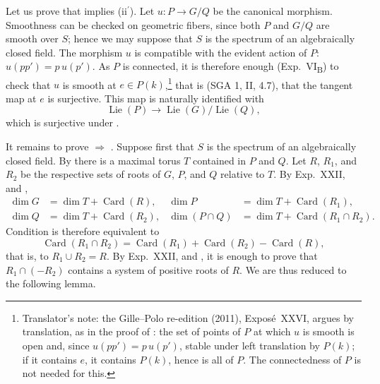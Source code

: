 Let us prove that \textup{} implies
\textup{(ii\(^{\prime}\))}.  Let \(u:P\to G/Q\) be the canonical
morphism.  Smoothness can be checked on geometric fibers, since both
\(P\) and \(G/Q\) are smooth over \(S\); hence we may suppose that
\(S\) is the spectrum of an algebraically closed field.  The morphism
\(u\) is compatible with the evident action of \(P\):
\(u(pp')=p\,u(p')\).  As \(P\) is connected, it is therefore enough
(Exp.\ VI\textsubscript{B}) to check that \(u\) is smooth at
\(e\in P(k)\),\footnote{Translator's note: the Gille--Polo re-edition (2011), Exposé~XXVI, argues
by translation, as in the proof of : the set of points of
\(P\) at which \(u\) is smooth is open and, since \(u(pp')=p\,u(p')\), stable
under left translation by \(P(k)\); if it contains \(e\), it contains
\(P(k)\), hence is all of \(P\). The connectedness of \(P\) is not needed for
this.} that is (SGA 1, II, 4.7), that the tangent map at \(e\) is
surjective.  This map is naturally identified with
\[
 \operatorname{Lie}(P)\longrightarrow
 \operatorname{Lie}(G)/\operatorname{Lie}(Q),
\]
which is surjective under \textup{}.

It remains to prove \textup{} \(\Rightarrow\) \textup{}.
Suppose first that \(S\) is the spectrum of an algebraically closed
field.  By  there is a maximal torus \(T\) contained in \(P\) and
\(Q\).  Let \(R\), \(R_1\), and \(R_2\) be the respective sets of roots
of \(G\), \(P\), and \(Q\) relative to \(T\).  By Exp.\ XXII,  and
,
\[
\begin{aligned}
 \dim G&=\dim T+\operatorname{Card}(R),&
 \dim P&=\dim T+\operatorname{Card}(R_1),\\
 \dim Q&=\dim T+\operatorname{Card}(R_2),&
 \dim(P\cap Q)&=\dim T+\operatorname{Card}(R_1\cap R_2).
\end{aligned}
\]
Condition \textup{} is therefore equivalent to
\[
 \operatorname{Card}(R_1\cap R_2)
 =\operatorname{Card}(R_1)+\operatorname{Card}(R_2)
  -\operatorname{Card}(R),
\]
that is, to \(R_1\cup R_2=R\).  By Exp.\ XXII,  and , it is
enough to prove that \(R_1\cap(-R_2)\) contains a system of positive
roots of \(R\).  We are thus reduced to the following lemma.

